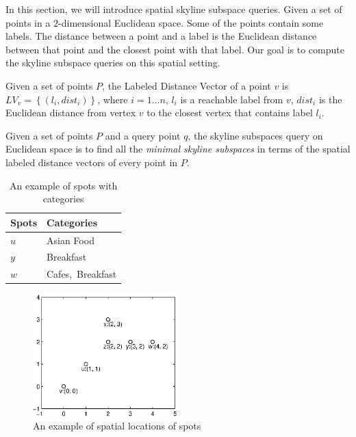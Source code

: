 In this section, we will introduce spatial skyline subspace queries. Given a set of points in a $2$-dimensional Euclidean space. Some of the points contain some labels. The distance between a point and a label is the Euclidean distance between that point and the closest point with that label. Our goal is to compute the skyline subspace queries on this spatial setting.

\begin{definition}
Given a set of points $P$, the Labeled Distance Vector of a point $v$ is $LV_v=\left\{\left(l_i, dist_i\right)\right\}$, where $i = 1 \ldots n$, $l_i$ is a reachable label from $v$, $dist_i$ is the Euclidean distance from vertex $v$ to the closest vertex that contains label $l_i$.
\end{definition}

\begin{definition}
Given a set of points $P$ and a query point $q$, the skyline subspaces query on Euclidean space is to find all the \emph{minimal skyline subspaces} in terms of the spatial labeled distance vectors of every point in $P$.
\end{definition}

\begin{table}[H]
    \centering
    \begin{tabular}{|l|l|}
    \hline
    Spots   & Categories \\ \hline
    $u$     & Asian Food     \\ \hline
    $y$     & Breakfast  \\ \hline
    $w$     & Cafes,~Breakfast   \\ \hline
    \end{tabular}
    \caption{An example of spots with categories}
    \label{tab:spot_category} 
\end{table}


\begin{figure}[H]
    \centering
    \includegraphics[width=0.5\textwidth]{figs/spatial_figure}
    \caption{An example of spatial locations of spots}
    \label{fig:spatial_map}
\end{figure}

